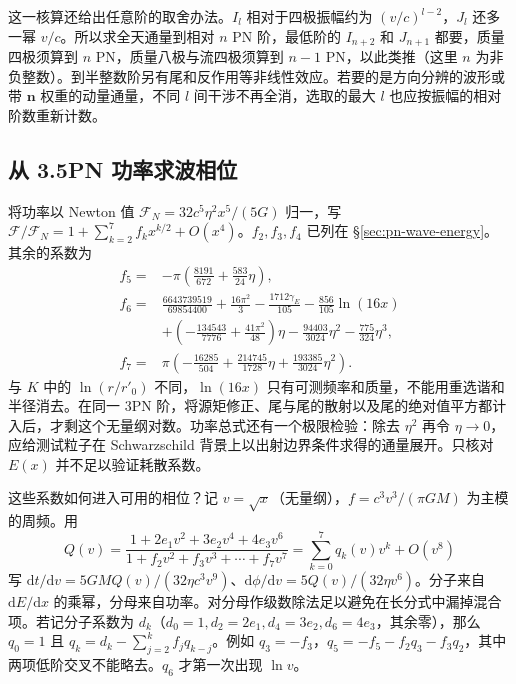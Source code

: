 这一核算还给出任意阶的取舍办法。$I_l$ 相对于四极振幅约为 $(v/c)^{l-2}$，$J_l$ 还多一幂 $v/c$。所以求全天通量到相对 $n$ PN 阶，最低阶的 $I_{n+2}$ 和 $J_{n+1}$ 都要，质量四极须算到 $n$ PN，质量八极与流四极须算到 $n-1$ PN，以此类推（这里 $n$ 为非负整数）。到半整数阶另有尾和反作用等非线性效应。若要的是方向分辨的波形或带 $\bm n$ 权重的动量通量，不同 $l$ 间干涉不再全消，选取的最大 $l$ 也应按振幅的相对阶数重新计数。

\subsection{从 3.5PN 功率求波相位}

将功率以 Newton 值 $\mathcal F_N=32c^5\eta^2x^5/(5G)$ 归一，写 $\mathcal F/\mathcal F_N=1+\sum_{k=2}^7 f_k x^{k/2}+O(x^4)$。$f_2,f_3,f_4$ 已列在 \S\ref{sec:pn-wave-energy}。其余的系数为
\begin{align*}
 f_5={}&-\pi\left(\frac{8191}{672}+\frac{583}{24}\eta\right),\\
 f_6={}&\frac{6643739519}{69854400}+\frac{16\pi^2}{3}
           -\frac{1712\gamma_E}{105}-\frac{856}{105}\ln(16x)\\
      &+\left(-\frac{134543}{7776}+\frac{41\pi^2}{48}\right)\eta
           -\frac{94403}{3024}\eta^2-\frac{775}{324}\eta^3,\\
 f_7={}&\pi\left(-\frac{16285}{504}+\frac{214745}{1728}\eta
                                +\frac{193385}{3024}\eta^2\right).
\end{align*}
与 $K$ 中的 $\ln(r/r'_0)$ 不同，$\ln(16x)$ 只有可测频率和质量，不能用重选谐和半径消去。在同一 3PN 阶，将源矩修正、尾与尾的散射以及尾的绝对值平方都计入后，才剩这个无量纲对数。功率总式还有一个极限检验：除去 $\eta^2$ 再令 $\eta\to0$，应给测试粒子在 Schwarzschild 背景上以出射边界条件求得的通量展开。只核对 $E(x)$ 并不足以验证耗散系数。

这些系数如何进入可用的相位？记 $v=\sqrt{x}$（无量纲），$f=c^3v^3/(\pi GM)$ 为主模的周频。用
\[
 Q(v)=\frac{1+2e_1v^2+3e_2v^4+4e_3v^6}
                {1+f_2v^2+f_3v^3+\cdots+f_7v^7}
      =\sum_{k=0}^7 q_k(v)v^k+O(v^8)
\]
写 $\mathrm dt/\mathrm dv=5GM Q(v)/(32\eta c^3 v^9)$、$\mathrm d\phi/\mathrm dv=5Q(v)/(32\eta v^6)$。分子来自 $\mathrm dE/\mathrm dx$ 的乘幂，分母来自功率。对分母作级数除法足以避免在长分式中漏掉混合项。若记分子系数为 $d_k$（$d_0=1,d_2=2e_1,d_4=3e_2,d_6=4e_3$，其余零），那么 $q_0=1$ 且 $q_k=d_k-\sum_{j=2}^k f_jq_{k-j}$。例如 $q_3=-f_3$，$q_5=-f_5-f_2q_3-f_3q_2$，其中两项低阶交叉不能略去。$q_6$ 才第一次出现 $\ln v$。

